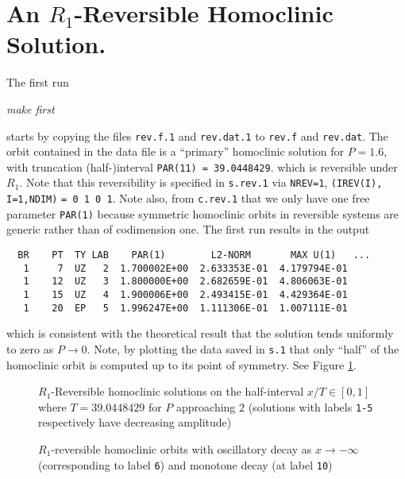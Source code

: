 \documentclass[12pt]{report}
\begin{document}
\section{An $R_1$-Reversible Homoclinic Solution.}

The first run
\begin{center}
\it make first
\end{center}
starts by 
copying the files {\tt rev.f.1} and {\tt rev.dat.1} to 
{\tt rev.f} and {\tt rev.dat}. The orbit contained in
the data file is a ``primary'' homoclinic solution for $P=1.6$, with
truncation (half-)interval {\tt PAR(11) = 39.0448429}.
which is reversible under $R_1$. Note that this reversibility is
specified in {\tt s.rev.1} via {\tt NREV=1}, 
{\tt (IREV(I), I=1,NDIM)} {\tt = 0 1 0 1}. Note also, from
{\tt c.rev.1} that we only have one free parameter {\tt PAR(1)}
because symmetric homoclinic orbits in reversible systems are
generic rather than of codimension one.
The first run  results in the output
\begin{verbatim}
  BR    PT  TY LAB    PAR(1)        L2-NORM       MAX U(1)   ...   
   1     7  UZ   2  1.700002E+00  2.633353E-01  4.179794E-01
   1    12  UZ   3  1.800000E+00  2.682659E-01  4.806063E-01
   1    15  UZ   4  1.900006E+00  2.493415E-01  4.429364E-01
   1    20  EP   5  1.996247E+00  1.111306E-01  1.007111E-01
\end{verbatim}
which is consistent with the theoretical result that the solution
tends uniformly to zero as $P\to 0$. Note, by plotting the data
saved in {\tt s.1} that only ``half'' of the 
homoclinic orbit is computed up to its point of symmetry. See Figure
\ref{Frev1}.

\begin{figure}[p]
\epsfysize 9.0cm
\centerline{}
\caption{$R_1$-Reversible homoclinic solutions on the half-interval
$x/T \in [0,1]$ where $T=39.0448429$ for $P$ approaching $2$ (solutions
with labels {\tt 1-5} respectively have decreasing amplitude)}
\label{Frev1}
\end{figure}
\begin{figure}[p]
\epsfysize 9.0cm
\centerline{}
\caption{$R_1$-reversible homoclinic orbits with oscillatory decay 
as $x \to -\infty$ (corresponding to label {\tt 6}) and monotone decay 
(at label {\tt 10})}
\label{Frev2}
\end{figure}
\end{document}
